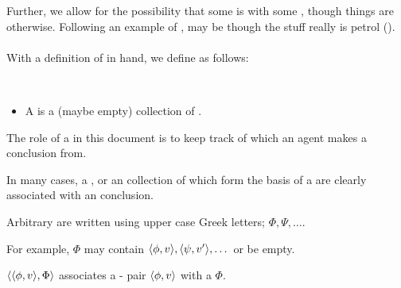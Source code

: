   \begin{note}
    Further, we allow for the possibility that some  is  with some , though things are otherwise.
    Following an example of \citeauthor{Williams:1979wi},  may be \evaled{}  though the stuff really is petrol (\citeyear[18]{Williams:1979wi}).%

  \end{note}

  \paragraph*{}

  \begin{note}
    With a definition of  in hand, we define  as follows:

    \begin{definition}[\pool{3}]
      \label{def:pools}
      \mbox{ }
      \vspace{-\baselineskip}
      \begin{itemize}
      \item
        A \emph{\pool{}} is a (maybe empty) collection of .
      \end{itemize}
      \vspace{-\baselineskip}
    \end{definition}

    \noindent%
    The role of a \pool{} in this document is to keep track of which  an agent makes a conclusion from.

    In many cases, a \pool{}, or an collection of \evalN{} which form the basis of a \pool{} are clearly associated with an conclusion.

    \begin{notationList}
    \item
      Arbitrary  are written using upper case Greek letters; \(\Phi, \Psi, \dots\).

      For example, \(\Phi\) may contain \(\langle \phi, v \rangle, \langle \psi, v' \rangle, \dots\) or be empty.
    \item
      \(\langle \langle \phi, v \rangle, \Phi \rangle\) associates a - pair \(\langle \phi, v \rangle\) with a \pool{} \(\Phi\).
    \end{notationList}
\end{note}


